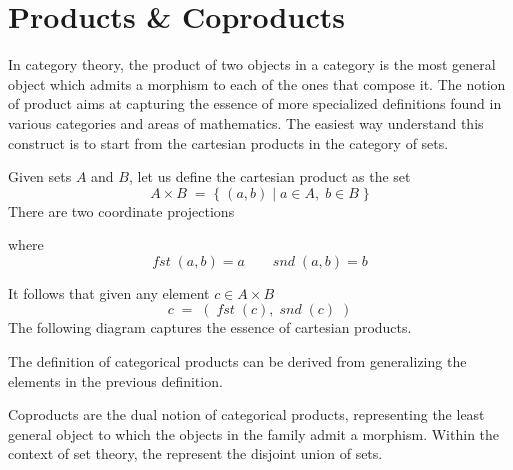 \section{Products \& Coproducts}

In category theory, the product of two objects in a category is the most general object which admits a morphism to each of the ones that compose it. The notion of product aims at capturing the essence of more specialized definitions found in various categories and areas of mathematics. The easiest way understand this construct is to start from the cartesian products in the category of sets.

Given sets $A$ and $B$, let us define the cartesian product as the set $$A \times B\; =\; \{\; (a, b)\; |\; a \in A,\; b \in B\; \} $$ There are two coordinate projections
\begin{center}
\end{center}
where $$ fst\; (a, b) = a \qquad snd\; (a, b) = b $$ 

It follows that given any element $ c \in A \times B $ $$ c\; =\; (\; fst\; (c),\; snd\; (c)\; )$$ 
The following diagram captures the essence of cartesian products.

\begin{center}
\end{center}

The definition of categorical products can be derived from generalizing the elements in the previous definition.

Coproducts are the dual notion of categorical products, representing the least general object to which the objects in the family admit a morphism. Within the context of set theory, the represent the disjoint union of sets.


